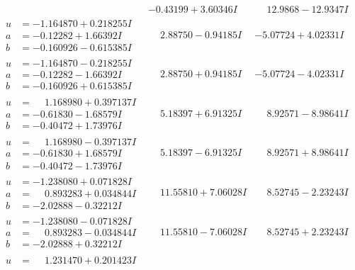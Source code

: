 \documentclass[1p]{elsarticle_modified}
\theoremstyle{definition}
\begin{document}
$$\begin{array}{c|c|c}
 & -0.43199 + 3.60346 I & \phantom{-}12.9868 - 12.9347 I \\ \hline\begin{aligned}
u &= -1.164870 + 0.218255 I \\
a &= -0.12282 + 1.66392 I \\
b &= -0.160926 - 0.615385 I\end{aligned}
 & \phantom{-}2.88750 - 0.94185 I & -5.07724 + 4.02331 I \\ \hline\begin{aligned}
u &= -1.164870 - 0.218255 I \\
a &= -0.12282 - 1.66392 I \\
b &= -0.160926 + 0.615385 I\end{aligned}
 & \phantom{-}2.88750 + 0.94185 I & -5.07724 - 4.02331 I \\ \hline\begin{aligned}
u &= \phantom{-}1.168980 + 0.397137 I \\
a &= -0.61830 - 1.68579 I \\
b &= -0.40472 + 1.73976 I\end{aligned}
 & \phantom{-}5.18397 + 6.91325 I & \phantom{-}8.92571 - 8.98641 I \\ \hline\begin{aligned}
u &= \phantom{-}1.168980 - 0.397137 I \\
a &= -0.61830 + 1.68579 I \\
b &= -0.40472 - 1.73976 I\end{aligned}
 & \phantom{-}5.18397 - 6.91325 I & \phantom{-}8.92571 + 8.98641 I \\ \hline\begin{aligned}
u &= -1.238080 + 0.071828 I \\
a &= \phantom{-}0.893283 + 0.034844 I \\
b &= -2.02888 - 0.32212 I\end{aligned}
 & \phantom{-}11.55810 + 7.06028 I & \phantom{-}8.52745 - 2.23243 I \\ \hline\begin{aligned}
u &= -1.238080 - 0.071828 I \\
a &= \phantom{-}0.893283 - 0.034844 I \\
b &= -2.02888 + 0.32212 I\end{aligned}
 & \phantom{-}11.55810 - 7.06028 I & \phantom{-}8.52745 + 2.23243 I \\ \hline\begin{aligned}
u &= \phantom{-}1.231470 + 0.201423 I \\

\end{aligned}
\end{array}$$
\end{document}
